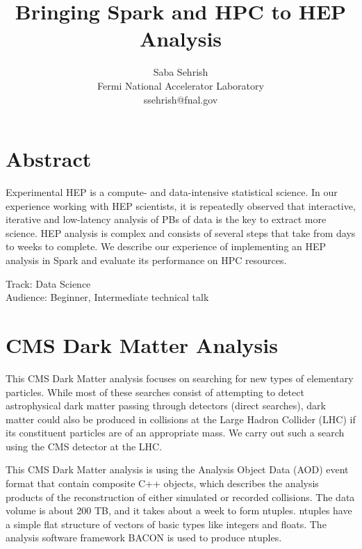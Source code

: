 \documentclass[11pt, twocolumn]{article}
\newcommand{\squeezeup}{\vspace{-5.5mm}}
\begin{document}
\title{Bringing Spark and HPC to HEP Analysis}
\author{Saba Sehrish \\ Fermi National Accelerator Laboratory \\ ssehrish@fnal.gov}
\date{}
\maketitle

\thispagestyle{empty}

\section*{Abstract}
\squeezeup
Experimental HEP is a compute- and data-intensive statistical science. 
In our experience working with HEP scientists, it is repeatedly observed 
that interactive, iterative and low-latency analysis of PBs of data is the 
key to extract more science. HEP analysis is complex and consists of 
several steps that take from days to weeks to complete. We describe 
our experience of implementing an HEP analysis in Spark 
and evaluate its performance on HPC resources.

Track: Data Science \\
Audience: Beginner, Intermediate technical talk \\
\squeezeup

\section{CMS Dark Matter Analysis}
This CMS Dark Matter analysis focuses on searching for new types of 
elementary particles. 
While most of these searches consist of attempting to detect astrophysical 
dark matter passing through detectors (direct searches), dark matter could 
also be produced in collisions at the Large Hadron Collider (LHC) if its 
constituent particles are of an appropriate mass. We carry out such a 
search using the CMS detector at the LHC.

This CMS Dark Matter analysis is using the Analysis Object Data (AOD) event 
format that contain composite C++ objects, which describes the analysis products 
of the reconstruction of either simulated or recorded collisions. 
The data volume is about 200 TB, and it takes about a week to form ntuples. 
 ntuples have a simple flat structure of vectors of basic types like integers and floats. 
The analysis software framework BACON is used to produce ntuples. 
\end{document}
